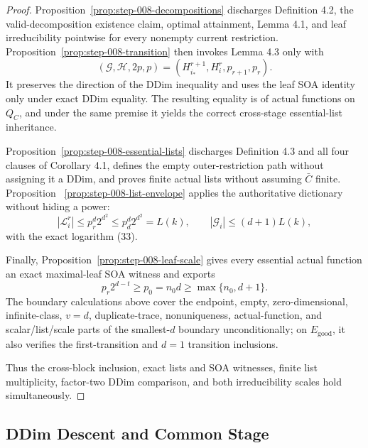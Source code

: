 \begin{proof}
Proposition~\ref{prop:step-008-decompositions} discharges Definition 4.2,
the valid-decomposition existence claim, optimal attainment, Lemma 4.1,
and leaf irreducibility pointwise for every nonempty current restriction.
Proposition~\ref{prop:step-008-transition} then invokes Lemma 4.3 only with
\[
 (\mathcal G,\mathcal H,2p,p)
 =(H_{i_*}^{r+1},H_i^r,p_{r+1},p_r).
\]
It preserves the direction of the DDim inequality and uses the leaf SOA
identity only under exact DDim equality. The resulting equality is of
actual functions on \(Q_C\), and under the same premise it yields the
correct cross-stage essential-list inheritance.

Proposition~\ref{prop:step-008-essential-lists} discharges Definition 4.3
and all four clauses of Corollary 4.1, defines the empty outer-restriction
path without assigning it a DDim, and proves finite actual lists without
assuming \(\bar C\) finite. Proposition
~\ref{prop:step-008-list-envelope} applies the authoritative dictionary
without hiding a power:
\[
 |\mathcal L_i^r|\le p_r^d2^{d^2}
 \le p_d^d2^{d^2}=L(k),
 \qquad
 |\mathcal G_i|\le(d+1)L(k),
\]
with the exact logarithm (33).

Finally, Proposition~\ref{prop:step-008-leaf-scale} gives every essential
actual function an exact maximal-leaf SOA witness and exports
\[
 p_r2^{d-t}\ge p_0=n_0d\ge\max\{n_0,d+1\}.
\]
The boundary calculations above cover the endpoint,
empty, zero-dimensional, infinite-class, \(v=d\), duplicate-trace,
nonuniqueness, actual-function, and scalar/list/scale parts of the
smallest-\(d\) boundary unconditionally; on \(E_{\mathrm{good}}\), it also
verifies the first-transition and \(d=1\) transition inclusions.

Thus the cross-block inclusion, exact lists and SOA witnesses, finite list
multiplicity, factor-two DDim comparison, and both irreducibility scales
hold simultaneously.



\end{proof}

\subsection{DDim Descent and Common Stage}\label{app:step_009}

